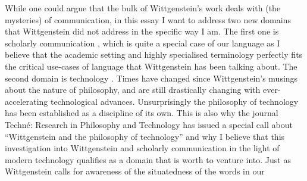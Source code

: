 While one could argue that the bulk of Wittgenstein’s work deals with
(the mysteries) of communication, in this essay I want to address two
new domains that Wittgenstein did not address in the specific way I am.
The first one is scholarly communication , which is quite a
special case of our language as I believe that the academic setting and
highly specialised terminology perfectly fits the critical use-cases of
language that Wittgenstein has been talking about. The second domain is
technology . Times have changed since Wittgenstein’s musings about
the nature of philosophy, and are still drastically changing with
ever-accelerating technological advances. Unsurprisingly the philosophy
of technology has been established as a discipline of its own. This is
also why the journal Techné: Research in Philosophy and
Technology has issued a special call about “Wittgenstein and the
philosophy of technology” and why I believe that this investigation
into Wittgenstein and scholarly communication in the light of modern
technology qualifies as a domain that is worth to venture into. Just as
Wittgenstein calls for awareness of the situatedness of the words in our
